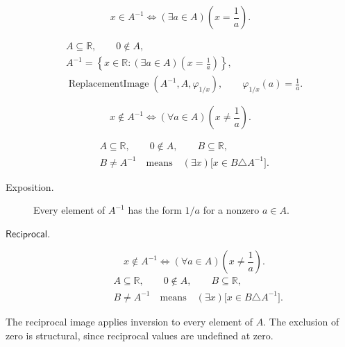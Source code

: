 \begin{remark*}
\[
x\in A^{-1}\Longleftrightarrow(\exists a\in A)\left(x=\frac{1}{a}\right).
\]
\end{remark*}

\begin{remark*}
\[
\begin{aligned}
&A\subseteq\mathbb{R},\qquad 0\notin A,\\
&A^{-1}=\left\{x\in\mathbb{R}:(\exists a\in A)\left(x=\frac{1}{a}\right)\right\},\\
&\operatorname{ReplacementImage}(A^{-1},A,\varphi_{1/x}),\qquad
\varphi_{1/x}(a)=\frac{1}{a}.
\end{aligned}
\]
\end{remark*}

\begin{remark*}
\[
x\notin A^{-1}\Longleftrightarrow(\forall a\in A)\left(x\neq\frac{1}{a}\right).
\]
\end{remark*}

\begin{remark*}
\[
\begin{aligned}
&A\subseteq\mathbb{R},\qquad 0\notin A,\qquad B\subseteq\mathbb{R},\\
&B\ne A^{-1}
\quad\text{means}\quad
(\exists x)\bigl[x\in B\triangle A^{-1}\bigr].
\end{aligned}
\]
\end{remark*}

\begin{remark*}
\begin{description}
  \item[Exposition.]
Every element of $A^{-1}$ has the form $1/a$ for a nonzero $a\in A$.


  \item[\(\mathsf{Reciprocal}.\)]
  \[
x\notin A^{-1}\Longleftrightarrow(\forall a\in A)\left(x\neq\frac{1}{a}\right).
\]
\[
\begin{aligned}
&A\subseteq\mathbb{R},\qquad 0\notin A,\qquad B\subseteq\mathbb{R},\\
&B\ne A^{-1}
\quad\text{means}\quad
(\exists x)\bigl[x\in B\triangle A^{-1}\bigr].
\end{aligned}
\]
\end{description}
\end{remark*}

\begin{remark*}[Interpretation]
The reciprocal image applies inversion to every element of $A$. The exclusion
of zero is structural, since reciprocal values are undefined at zero.
\end{remark*}

